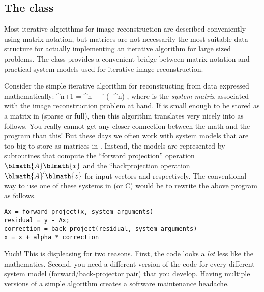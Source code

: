 
\newcommand{\A} {\blmath{A}}
\newcommand{\x} {\blmath{x}}
\newcommand{\y} {\blmath{y}}
\newcommand{\z} {\blmath{z}}

\subsection{The \fatrix class}

Most iterative algorithms
for image reconstruction
are described conveniently using matrix notation,
but matrices are not necessarily
the most suitable data structure
for actually implementing an iterative algorithm
for large sized problems.
The \fatrix class
provides a convenient bridge
between matrix notation
and practical system models
used for iterative image reconstruction.

Consider the simple iterative algorithm
for reconstructing \x from data \y
expressed mathematically:
\be
\x^{n+1} = \x^n + \alpha \A' (\y - \A\x^n)
,
where \A is the \emph{system matrix}
associated with
the image reconstruction problem at hand.
%
If \A is small enough
to be stored as a matrix in \matlab
(sparse or full),
then this algorithm translates
very nicely into \matlab as follows.
\be
{}
You really cannot get any closer connection
between the math and the program than this!
But these days we often work
with system models
that are too big to store
as matrices in \matlab.
Instead,
the models
are represented by subroutines
that compute the ``forward projection'' operation
$\A \x$
and the ``backprojection operation
$\A' \z$
for input vectors \x and \z respectively.
%
The conventional way
to use one of these systems
in \matlab (or C) would be to rewrite
the above program as follows.
\begin{verbatim}
Ax = forward_project(x, system_arguments)
residual = y - Ax;
correction = back_project(residual, system_arguments)
x = x + alpha * correction
\end{verbatim}
Yuch!
This is displeasing for two reasons.
First,
the code looks a \emph{lot} less like the mathematics.
Second,
you need a different version of the code
for every different system model
(forward/back-projector pair)
that you develop.
Having multiple versions
of a simple algorithm
creates a software maintenance headache.

